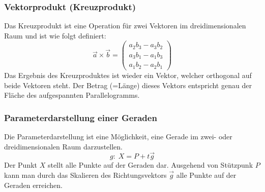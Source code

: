 \subsubsection{Vektorprodukt (Kreuzprodukt)}
Das Kreuzprodukt ist eine Operation für zwei Vektoren im dreidimensionalen Raum und ist wie folgt definiert:
\begin{equation}
\vec{a} \times \vec{b} = 
\begin{pmatrix}
a_2 b_3 - a_3 b_2 \\
a_3 b_1 - a_1 b_3 \\
a_1 b_2 - a_2 b_1
\end{pmatrix}
\end{equation}
Das Ergebnis des Kreuzproduktes ist wieder ein Vektor, welcher orthogonal auf beide Vektoren steht. Der Betrag (=Länge) dieses Vektors entspricht genau der Fläche des aufgespannten Parallelogramms. \\
\begin{center}
\end{center}

\subsubsection{Parameterdarstellung einer Geraden}
Die Parameterdarstellung ist eine Möglichkeit, eine Gerade im zwei- oder dreidimensionalen Raum darzustellen.
\begin{equation}
    g:\;X=P+t\vec{g}
\end{equation}
Der Punkt $X$ stellt alle Punkte auf der Geraden dar. Ausgehend von Stützpunk $P$ kann man durch das Skalieren des Richtungsvektors $\vec{g}$ alle Punkte auf der Geraden erreichen.

\begin{center}
\end{center}

